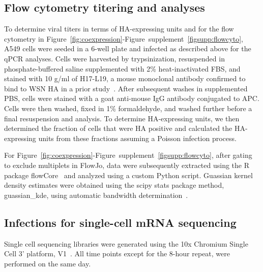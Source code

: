 \documentclass[9pt,lineno]{elife}
\begin{document}
\subsection{Flow cytometry titering and analyses}
To determine viral titers in terms of HA-expressing units and for the flow cytometry in Figure~\ref{fig:coexpression}-Figure~supplement~\ref{figsupp:flowcyto}, A549 cells were seeded in a 6-well plate and infected as described above for the qPCR analyses.
Cells were harvested by trypsinization, resuspended in phosphate-buffered saline supplemented with 2\% heat-inactivated FBS, and stained with 10 \si{\micro}g/ml of H17-L19, a mouse monoclonal antibody confirmed to bind to WSN HA in a prior study~\citep{Doud:2017bw}.
After subsequent washes in supplemented PBS, cells were stained with a goat anti-mouse IgG antibody conjugated to APC.
Cells were then washed, fixed in 1\% formaldehyde, and washed further before a final resuspension and analysis. 
To determine HA-expressing units, we then determined the fraction of cells that were HA positive and calculated the HA-expressing units from these fractions assuming a Poisson infection process.

For Figure~\ref{fig:coexpression}-Figure~supplement~\ref{figsupp:flowcyto}, after gating to exclude multiplets in FlowJo, data were subsequently extracted using the R package flowCore~\citep{LeMeur:2007uo} and analyzed using a custom Python script.
Guassian kernel density estimates were obtained using the scipy stats package method, guassian\_kde, using automatic bandwidth determination~\citep{vanderWalt:2017dp}.

\subsection{Infections for single-cell mRNA sequencing}
Single cell sequencing libraries were generated using the 10x Chromium Single Cell 3' platform, V1~\cite{zheng2017massively}.
All time points except for the 8-hour repeat, were performed on the same day.
\end{document}
